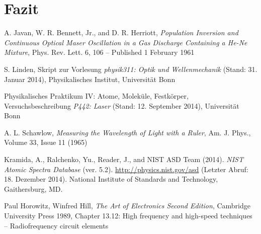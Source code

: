 \documentclass[11pt, a4paper]{article}
\numberwithin{equation}{section}
\begin{document}
\section{Fazit}

\begin{figure}
\centering

\end{figure}

\vspace{\fill}
\begin{thebibliography}{9}
	A. Javan, W. R. Bennett, Jr., and D. R. Herriott,
	\emph{Population Inversion and Continuous Optical Maser Oscillation in a Gas Discharge Containing a He-Ne Mixture},
	Phys. Rev. Lett. 6, 106 – Published 1 February 1961

	S. Linden,
	Skript zur Vorlesung \emph{physik311: Optik und Wellenmechanik} (Stand: 31. Januar 2014),
	Physikalisches Institut, Universität Bonn

	Physikalisches Praktikum IV: Atome, Moleküle, Festkörper,
	Versuchsbeschreibung \emph{P442: Laser} (Stand: 12. September 2014),
	Universität Bonn

	A. L. Schawlow,
	\emph{Measuring the Wavelength of Light with a Ruler},
	Am. J. Phys., Volume 33, Issue 11 (1965)

	Kramida, A., Ralchenko, Yu., Reader, J., and NIST ASD Team (2014).
	\emph{NIST Atomic Spectra Database} (ver. 5.2).
	\url{http://physics.nist.gov/asd} (Letzter Abruf: 18. Dezember 2014).
	National Institute of Standards and Technology, Gaithersburg, MD.
	
	Paul Horowitz, Winfred Hill,
	\emph{The Art of Electronics Second Edition},
	Cambridge University Press 1989,
	Chapter 13.12: High frequency and high-speed techniques -- Radiofrequency circuit elements
 
\end{thebibliography}

\clearpage
\end{document}
